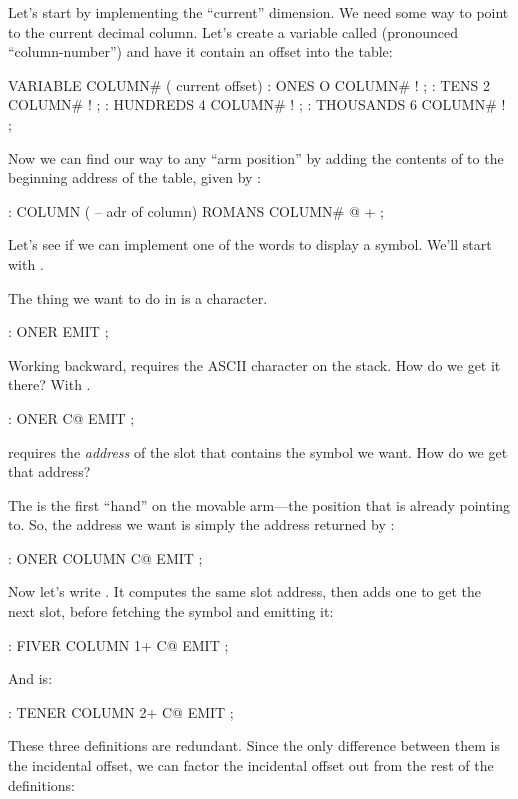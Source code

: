 Let's start by implementing the ``current'' dimension. We need
some way to point to the current decimal column. Let's create a variable
called  (pronounced ``column-number'') and have it contain an
offset into the table:

\begin{Code}
VARIABLE COLUMN#  ( current offset)
: ONES        O COLUMN# ! ;
: TENS        2 COLUMN# ! ;
: HUNDREDS    4 COLUMN# ! ;
: THOUSANDS   6 COLUMN# ! ;
\end{Code}
Now we can find our way to any ``arm position'' by adding the contents of
 to the beginning address of the table, given by :

\begin{Code}
: COLUMN  ( -- adr of column)  ROMANS  COLUMN# @  + ;
\end{Code}
Let's see if we can implement one of the words to display a symbol. We'll
start with .

The thing we want to do in  is  a character.

\begin{Code}
: ONER                   EMIT ;
\end{Code}
Working backward,  requires the ASCII character on the stack.
How do we get it there? With .

\begin{Code}
: ONER                C@ EMIT ;
\end{Code}
 requires the \emph{address} of the slot that contains the symbol we
want. How do we get that address?

The  is the first ``hand'' on the movable arm---the position
that  is already pointing to. So, the address we want is simply
the address returned by :

\begin{Code}
: ONER   COLUMN       C@ EMIT ;
\end{Code}
Now let's write . It computes the same slot address, then adds
one to get the next slot, before fetching the symbol and emitting it:

\begin{Code}
: FIVER  COLUMN 1+    C@ EMIT ;
\end{Code}
And  is:

\begin{Code}
: TENER  COLUMN 2+    C@ EMIT ;
\end{Code}
These three definitions are redundant. Since the only difference between
them is the incidental offset, we can factor the incidental offset out from
the rest of the definitions:

